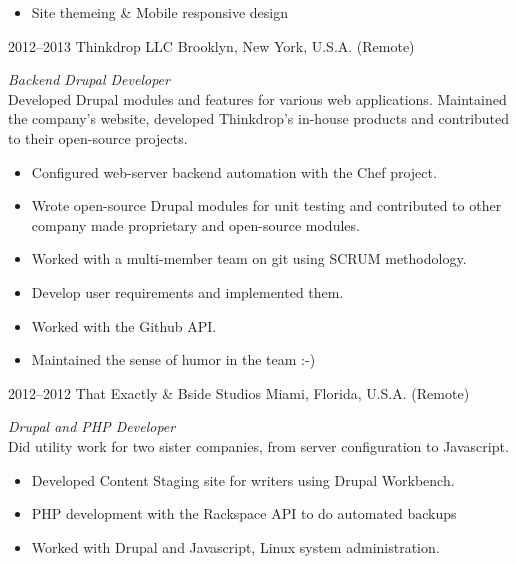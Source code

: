\documentclass[]{friggeri-cv} %
\begin{document}
\begin{entrylist}
{\begin{itemize}
\item Site themeing \& Mobile responsive design
\end{itemize}}
\entry
{2012--2013}
{Thinkdrop LLC}
{Brooklyn, New York, U.S.A. (Remote)}
{ \emph{Backend Drupal Developer } \\
Developed Drupal modules and features for various web applications. Maintained the company's website, developed Thinkdrop's in-house products and contributed to their open-source projects.
\begin{itemize}
\item Configured web-server backend automation with the Chef project.
\item Wrote open-source Drupal modules for unit testing and contributed to other company made proprietary and open-source modules.
\item Worked with a multi-member team on git using SCRUM methodology.
\item Develop user requirements and implemented them.
\item Worked with the Github API.
\item Maintained the sense of humor in the team :-)
\end{itemize}}
\entry
{2012--2012}
{That Exactly \& Bside Studios}
{Miami, Florida, U.S.A. (Remote)}
{\emph{Drupal and PHP Developer} \\
Did utility work for two sister companies, from server configuration to Javascript.
\begin{itemize}
\item Developed Content Staging site for writers using Drupal Workbench.
\item PHP development with the Rackspace API to do automated backups
\item Worked with Drupal and Javascript, Linux system administration.
\end{itemize}}

\end{entrylist}
\end{document}
